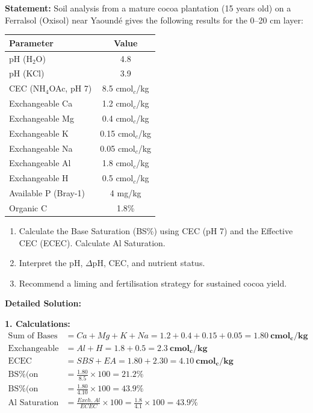 \documentclass[11pt]{article}
\begin{document}
\begin{exoresolu}
\textbf{Statement:} Soil analysis from a mature cocoa plantation (15 years old) on a Ferralsol (Oxisol) near Yaoundé gives the following results for the 0--20 cm layer:
\begin{center}
\begin{tabular}{|l|c|}\hline
\rowcolor{popblueL}
\textbf{Parameter} & \textbf{Value} \\\hline
pH (H$_2$O) & 4.8 \\
pH (KCl) & 3.9 \\
CEC (NH$_4$OAc, pH 7) & 8.5 cmol$_c$/kg \\
Exchangeable Ca & 1.2 cmol$_c$/kg \\
Exchangeable Mg & 0.4 cmol$_c$/kg \\
Exchangeable K & 0.15 cmol$_c$/kg \\
Exchangeable Na & 0.05 cmol$_c$/kg \\
Exchangeable Al & 1.8 cmol$_c$/kg \\
Exchangeable H & 0.5 cmol$_c$/kg \\
Available P (Bray-1) & 4 mg/kg \\
Organic C & 1.8\% \\\hline
\end{tabular}
\end{center}
\begin{enumerate}
\item Calculate the Base Saturation (BS\%) using CEC (pH 7) and the Effective CEC (ECEC). Calculate Al Saturation.
\item Interpret the pH, $\Delta$pH, CEC, and nutrient status.
\item Recommend a liming and fertilisation strategy for sustained cocoa yield.
\end{enumerate}

\tcblower
\textbf{Detailed Solution:}

\noindent\textbf{1. Calculations:}
\begin{align*}
\text{Sum of Bases (SBS)} &= Ca + Mg + K + Na = 1.2 + 0.4 + 0.15 + 0.05 = \mathbf{1.80\ cmol_c/kg} \\
\text{Exchangeable Acidity (EA)} &= Al + H = 1.8 + 0.5 = \mathbf{2.3\ cmol_c/kg} \\
\text{ECEC} &= SBS + EA = 1.80 + 2.30 = \mathbf{4.10\ cmol_c/kg} \\
\text{BS\% (on CEC pH 7)} &= \frac{1.80}{8.5} \times 100 = \mathbf{21.2\%} \\
\text{BS\% (on ECEC)} &= \frac{1.80}{4.10} \times 100 = \mathbf{43.9\%} \\
\text{Al Saturation} &= \frac{Exch.\ Al}{ECEC} \times 100 = \frac{1.8}{4.1} \times 100 = \mathbf{43.9\%}
\end{align*}


\end{exoresolu}
\end{document}
